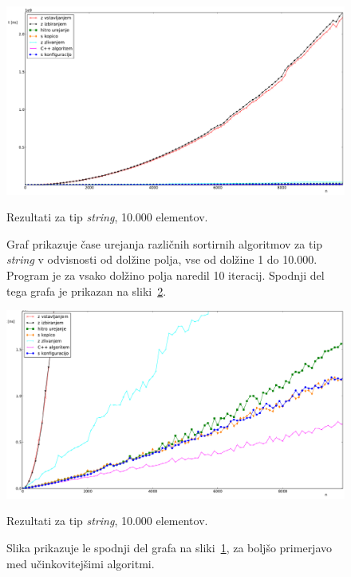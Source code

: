 \documentclass[a4paper,oneside,12pt]{article}
\begin{document}
\begin{figure}[h!]
    \includegraphics[width=\textwidth]{slike/string10000.pdf}
    \vspace{-0.7cm}
    \caption[Rezultati za tip \emph{string}, 10.000 el.]{Rezultati za tip
    \emph{string}, 10.000 elementov.}
    \caption*{{\small Graf prikazuje čase
    urejanja različnih sortirnih algoritmov za tip \emph{string} v odvisnosti od dolžine polja, vse
    od dolžine 1 do 10.000. Program je za vsako dolžino polja naredil 10
    iteracij. Spodnji del tega grafa je prikazan na
    sliki~\ref{fig:rez:string10000zoom}.}}
    \label{fig:rez:string10000}
\end{figure}

\begin{figure}[h!]
    \includegraphics[width=\textwidth]{slike/string10000zoom.pdf}
    \vspace{-0.7cm}
    \caption[Rezultati za tip \emph{string}, 10.000 el. -- izrez]{Rezultati za
    tip \emph{string}, 10.000 elementov.}
    \caption*{{\small Slika prikazuje le spodnji del grafa na sliki~\ref{fig:rez:string10000},
    za boljšo primerjavo med učinkovitejšimi algoritmi.}}
    \label{fig:rez:string10000zoom}
\end{figure}
\end{document}
